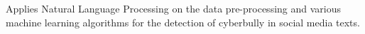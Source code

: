 Applies Natural Language Processing on the data pre-processing and various machine learning algorithms for the detection of cyberbully in social media texts. 
